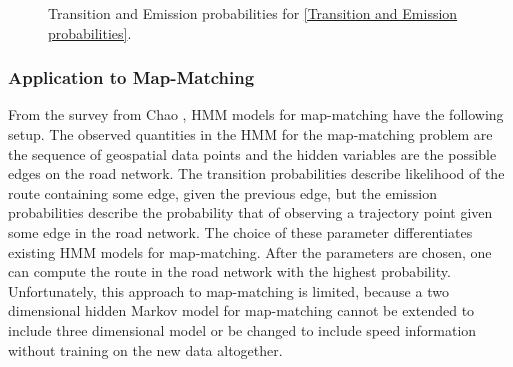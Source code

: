 \documentclass{article}
\numberwithin{equation}{section}
\theoremstyle{definition}
\begin{document}
\begin{figure}[h!]
    \centering
    \caption{Transition and Emission probabilities for \autoref{Transition and Emission probabilities}. }
    \label{TrEm}
\end{figure}








\subsubsection*{Application to Map-Matching}

From the survey from Chao \cite{CXHZ}, HMM models for map-matching have the following setup. The observed quantities in the HMM for the map-matching problem are the sequence of geospatial data points and the hidden variables are the possible edges on the road network. The transition probabilities describe likelihood of the route containing some edge, given the previous edge, but the emission probabilities describe the probability that of observing a trajectory point given some edge in the road network. The choice of these parameter differentiates existing HMM models for map-matching. After the parameters are chosen, one can compute the route in the road network with the highest probability.  
    Unfortunately, this approach to map-matching is limited, because a two dimensional hidden Markov model for map-matching cannot be extended to include three dimensional model or be changed to include speed information without training on the new data altogether. 
\end{document}
